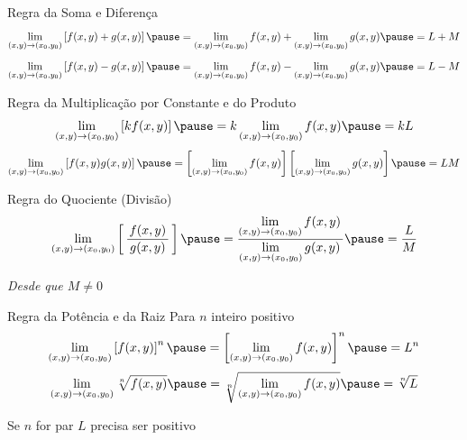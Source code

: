 \documentclass[fleqn,utf8,aspectratio=169,12pt,ignorenonframetext]{beamer}
\begin{document}
\begin{frame}{Regra da Soma e Diferença}
  \[
    \lim_{(x, y)\to(x_0, y_0)} \left[f(x, y) + g(x, y)\right]
    \pause =
    \lim_{(x, y)\to(x_0, y_0)} f(x, y) + \lim_{(x, y)\to(x_0, y_0)} g(x, y)
    \pause =
    L + M
  \]
  \pause
  \vspace{\baselineskip}
  \[
    \lim_{(x, y)\to(x_0, y_0)} \left[f(x, y) - g(x, y)\right]
    \pause =
    \lim_{(x, y)\to(x_0, y_0)} f(x, y) - \lim_{(x, y)\to(x_0, y_0)} g(x, y)
    \pause =
    L - M
  \]
\end{frame}

\begin{frame}{Regra da Multiplicação por Constante e do Produto}
  \[
    \lim_{(x, y)\to(x_0, y_0)} \left[k f(x, y)\right]
    \pause =
    k \lim_{(x, y)\to(x_0, y_0)} f(x, y)
    \pause =
    k L
  \]
  \pause
  \vspace{\baselineskip}
  \[
    \lim_{(x, y)\to(x_0, y_0)} \left[f(x, y) g(x, y)\right]
    \pause =
    \left[\lim_{(x, y)\to(x_0, y_0)} f(x, y) \right]
    \left[\lim_{(x, y)\to(x_0, y_0)} g(x, y) \right]
    \pause =
    LM
  \]
\end{frame}

\begin{frame}{Regra do Quociente (Divisão)}
  \[
    \lim_{(x, y)\to(x_0, y_0)} \left[ \,\frac{\,f(x, y)\,}{g(x, y)} \, \right]
    \pause =
    \dfrac{\displaystyle\lim_{(x, y)\to(x_0, y_0)} f(x, y)\,}
          {\displaystyle\lim_{(x, y)\to(x_0, y_0)} g(x, y)\,}
    \pause =
    \frac{L}{M}
  \]

  \pause
  \emph{Desde que \(M\neq 0\)}
\end{frame}

\begin{frame}{Regra da Potência e da Raiz}
  Para $n$ inteiro positivo
  \pause
  \[
    \lim_{(x, y)\to(x_0, y_0)} \left[f(x, y)\right]^n
    \pause =
    \left[\lim_{(x, y)\to(x_0, y_0)} f(x, y)\right]^n
    \pause =
    L^n
  \]
  \pause
  \vspace{\baselineskip}
  \[
    \lim_{(x, y)\to(x_0, y_0)} \sqrt[n]{f(x, y)}
    \pause =
    \sqrt[n]{\lim_{(x, y)\to(x_0, y_0)} f(x, y)}
    \pause =
    \sqrt[n]{L}
  \]

  \pause
  Se $n$ for par $L$ precisa ser positivo
\end{frame}
\end{document}
